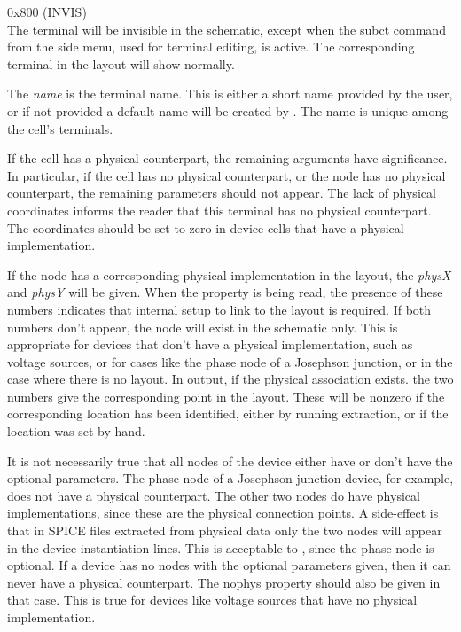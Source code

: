 \begin{description}
\begin{description}
\item{\vt 0x800} (INVIS)\\
The terminal will be invisible in the schematic, except when the {\cb
subct} command from the side menu, used for terminal editing, is
active.  The corresponding terminal in the layout will show normally.
\end{description}

The {\it name} is the terminal name.  This is either a short name
provided by the user, or if not provided a default name will be
created by {\Xic}.  The name is unique among the cell's terminals.

If the cell has a physical counterpart, the remaining arguments have
significance.  In particular, if the cell has no physical counterpart,
or the node has no physical counterpart, the remaining parameters
should not appear.  The lack of physical coordinates informs the
reader that this terminal has no physical counterpart.  The
coordinates should be set to zero in device cells that have a physical
implementation.

If the node has a corresponding physical implementation in the layout,
the {\it physX} and {\it physY} will be given.  When the property is
being read, the presence of these numbers indicates that internal
setup to link to the layout is required.  If both numbers don't
appear, the node will exist in the schematic only.  This is
appropriate for devices that don't have a physical implementation,
such as voltage sources, or for cases like the phase node of a
Josephson junction, or in the case where there is no layout.  In
output, if the physical association exists.  the two numbers give the
corresponding point in the layout.  These will be nonzero if the
corresponding location has been identified, either by running
extraction, or if the location was set by hand.

It is not necessarily true that all nodes of the device either have or
don't have the optional parameters.  The phase node of a Josephson
junction device, for example, does not have a physical counterpart. 
The other two nodes do have physical implementations, since these are
the physical connection points.  A side-effect is that in SPICE files
extracted from physical data only the two nodes will appear in the
device instantiation lines.  This is acceptable to {\WRspice},
since the phase node is optional.  If a device has no nodes with the
optional parameters given, then it can never have a physical
counterpart.  The {\et nophys} property should also be given in that
case.  This is true for devices like voltage sources that have no
physical implementation.


\end{description}
